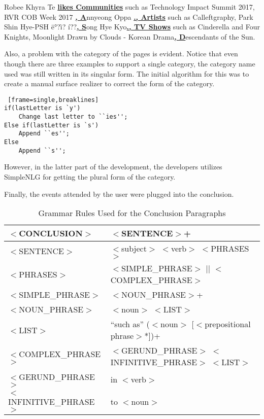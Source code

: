\begin{center} Robee Khyra Te \underline{\textbf{likes Communities}} such as Technology Impact Summit 2017, RVR COB Week 2017 \underline{\textbf{, A}}nnyeong Oppa \underline{\textbf{., Artists}} such as Calleftgraphy, Park Shin Hye-PSH ë°?ì? í??\underline{\textbf{, S}}ong Hye Kyo\underline{\textbf{., TV Shows}} such as Cinderella and Four Knights, Moonlight Drawn by Clouds - Korean Drama\underline{\textbf{, D}}escendants of the Sun. \end{center}

Also, a problem with the category of the pages is evident. Notice that even though there are three examples to support a single category, the category name used was still written in its singular form. The initial algorithm for this was to create a manual surface realizer to correct the form of the category.
\begin{lstlisting} [frame=single,breaklines]
if(lastLetter is `y')
	Change last letter to ``ies'';
Else if(lastLetter is `s')
	Append ``es'';
Else
	Append ``s'';
\end{lstlisting}

However, in the latter part of the development, the developers utilizes SimpleNLG for getting the plural form of the category. 

Finally, the events attended by the user were plugged into the conclusion.

 \clearpage
\begin{table}[ph!]   %
	\centering
	\caption{Grammar Rules Used for the Conclusion Paragraphs} \vspace{0.25em}
	\begin{tabular}{|p{2in}|p{2.5in}|} \hline
		$<$CONCLUSION$>$ & $<$SENTENCE$>$+ \\ \hline
		$<$SENTENCE$>$ & $<$subject$>$ $<$verb$>$ $<$PHRASES$>$ \\ \hline
		$<$PHRASES$>$ & $<$SIMPLE\_PHRASE$>$ $|$$|$ \newline $<$COMPLEX\_PHRASE$>$ \\ \hline
		$<$SIMPLE\_PHRASE$>$ & $<$NOUN\_PHRASE$>$+ \\ \hline
		$<$NOUN\_PHRASE$>$ & $<$noun$>$ $<$LIST$>$ \\ \hline
		$<$LIST$>$ & ``such as” ($<$noun$>$ [$<$prepositional phrase$>$*])+ \\ \hline
		$<$COMPLEX\_PHRASE$>$ & $<$GERUND\_PHRASE$>$ $<$INFINITIVE\_PHRASE$>$ $<$LIST$>$ \\ \hline
		$<$GERUND\_PHRASE$>$ & in $<$verb$>$ \\ \hline
		$<$INFINITIVE\_PHRASE$>$ & to $<$noun$>$ \\ \hline
	\end{tabular}
	\label{tab:GrammarRules-Conclusion}
\end{table}

